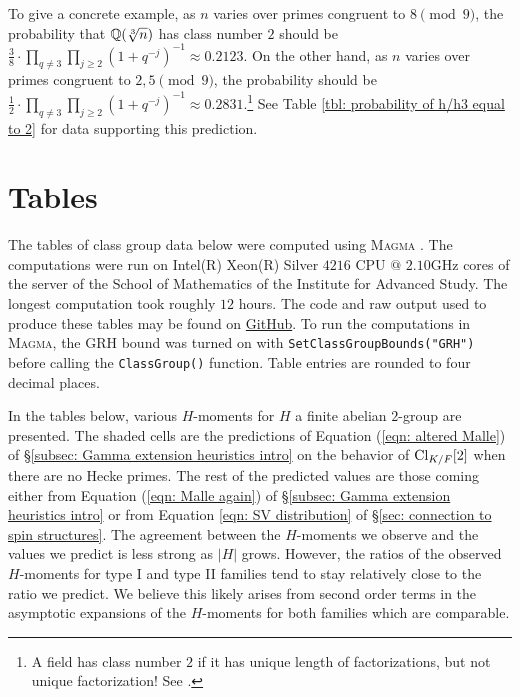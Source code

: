 \documentclass[11pt,a4paper]{amsart}
\def\Q{{\rm \mathbb{Q}}}
\def\Cl{{\rm Cl}}
\numberwithin{equation}{section}
\begin{document}
To give a concrete example, as $n$ varies over primes congruent to $8 \pmod{9}$, the probability that $\Q(\sqrt[3]{n})$ has class number $2$ should be $\frac{3}{8} \cdot
\prod_{q \neq 3} \prod_{j \ge 2} (1+q^{-j})^{-1} \approx 0.2123$. On the other hand, as $n$ varies over primes congruent to $2,5 \pmod{9}$, the probability should be $\frac{1}{2} \cdot \prod_{q \neq 3} \prod_{j \ge 2} (1+q^{-j})^{-1} \approx 0.2831$.\footnote{A field has class number $2$ if it has unique length of factorizations, but not unique factorization! See \cite{Carlitz}. } See Table \ref{tbl: probability of h/h3 equal to 2} for data supporting this prediction. 

 



\appendix





\section{Tables} \label{sec: appendix tables}

The tables of class group data below were computed using \textsc{Magma} \cite{Magma}. The computations were run on Intel(R) Xeon(R) Silver $4216$ CPU $@$ $2.10$GHz cores of the server of the School of Mathematics of the Institute for Advanced Study. The longest computation took roughly $12$ hours. 
The code and raw output used to produce these tables may be found on \href{https://github.com/ajsiad/Hecke-reciprocity-and-class-groups}{GitHub}. To run the computations in \textsc{Magma}, the GRH bound was turned on with \texttt{SetClassGroupBounds("GRH")} before calling the \texttt{ClassGroup()} function. Table entries are rounded to four decimal places.

In the tables below, various $H$-moments for $H$ a finite abelian $2$-group are presented. The shaded cells are the predictions of Equation (\ref{eqn: altered Malle}) of \S \ref{subsec: Gamma extension heuristics intro} on the behavior of $\Cl_{K/F}[2]$ when there are no Hecke primes. The rest of the predicted values are those coming either from Equation (\ref{eqn: Malle again}) of \S \ref{subsec: Gamma extension heuristics intro} or from Equation \ref{eqn: SV distribution} of \S \ref{sec: connection to spin structures}. The agreement between the $H$-moments we observe and the values we predict is less strong as $\lvert H \rvert$ grows. However, the ratios of the observed $H$-moments for type I and type II families tend to stay relatively close to the ratio we predict. We believe this likely arises from second order terms in the asymptotic expansions of the $H$-moments for both families which are comparable.
\end{document}
